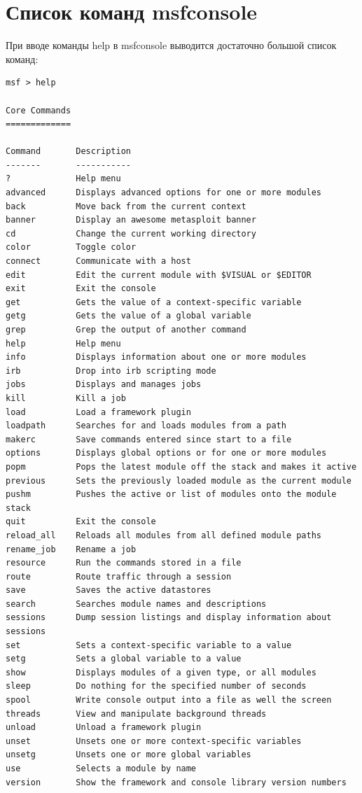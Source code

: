 \documentclass[10pt,a4paper]{report}
\begin{document}
		\section{Список команд msfconsole}
		При вводе команды help в msfconsole выводится достаточно большой список 
		команд:
		\begin{lstlisting}
msf > help

Core Commands
=============

Command       Description
-------       -----------
?             Help menu
advanced      Displays advanced options for one or more modules
back          Move back from the current context
banner        Display an awesome metasploit banner
cd            Change the current working directory
color         Toggle color
connect       Communicate with a host
edit          Edit the current module with $VISUAL or $EDITOR
exit          Exit the console
get           Gets the value of a context-specific variable
getg          Gets the value of a global variable
grep          Grep the output of another command
help          Help menu
info          Displays information about one or more modules
irb           Drop into irb scripting mode
jobs          Displays and manages jobs
kill          Kill a job
load          Load a framework plugin
loadpath      Searches for and loads modules from a path
makerc        Save commands entered since start to a file
options       Displays global options or for one or more modules
popm          Pops the latest module off the stack and makes it active
previous      Sets the previously loaded module as the current module
pushm         Pushes the active or list of modules onto the module stack
quit          Exit the console
reload_all    Reloads all modules from all defined module paths
rename_job    Rename a job
resource      Run the commands stored in a file
route         Route traffic through a session
save          Saves the active datastores
search        Searches module names and descriptions
sessions      Dump session listings and display information about sessions
set           Sets a context-specific variable to a value
setg          Sets a global variable to a value
show          Displays modules of a given type, or all modules
sleep         Do nothing for the specified number of seconds
spool         Write console output into a file as well the screen
threads       View and manipulate background threads
unload        Unload a framework plugin
unset         Unsets one or more context-specific variables
unsetg        Unsets one or more global variables
use           Selects a module by name
version       Show the framework and console library version numbers



\end{lstlisting}
\end{document}
